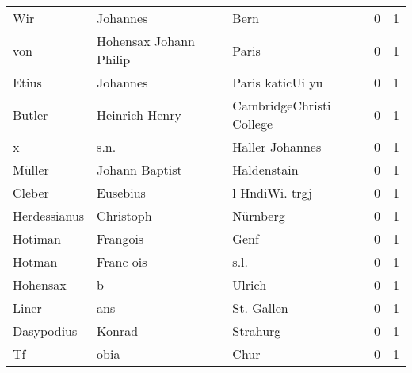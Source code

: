 \begin{tabular}{llllrr}
                      Wir &                           Johannes &             &                                        Bern &          0 &         1 \\
                      von &             Hohensax Johann Philip &             &                                       Paris &          0 &         1 \\
                    Etius &                           Johannes &             &                            Paris katicUi yu &          0 &         1 \\
                   Butler &                     Heinrich Henry &             &                    CambridgeChristi College &          0 &         1 \\
                        x &                               s.n. &             &                             Haller Johannes &          0 &         1 \\
                   Müller &                     Johann Baptist &             &                                 Haldenstain &          0 &         1 \\
                   Cleber &                           Eusebius &             &                              l HndiWi. trgj &          0 &         1 \\
             Herdessianus &                          Christoph &             &                                    Nürnberg &          0 &         1 \\
                  Hotiman &                           Frangois &             &                                        Genf &          0 &         1 \\
                   Hotman &                          Franc ois &             &                                        s.l. &          0 &         1 \\
                 Hohensax &                                  b &             &                                      Ulrich &          0 &         1 \\
                    Liner &                                ans &             &                                  St. Gallen &          0 &         1 \\
               Dasypodius &                             Konrad &             &                                    Strahurg &          0 &         1 \\
                       Tf &                               obia &             &                                        Chur &          0 &         1 \\

\end{tabular}
